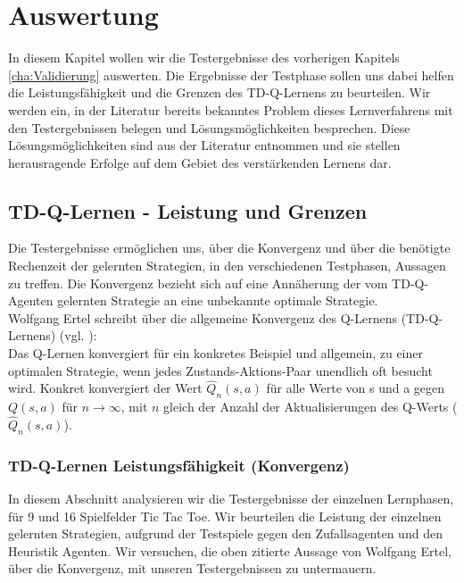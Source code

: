 \chapter{Auswertung}
\label{cha:Auswertung}
In diesem Kapitel wollen wir die Testergebnisse des vorherigen Kapitels \ref{cha:Validierung} auswerten. Die Ergebnisse der Testphase sollen uns dabei helfen die Leistungsfähigkeit und die Grenzen des TD-Q-Lernens zu beurteilen. Wir werden ein, in der Literatur bereits bekanntes Problem dieses Lernverfahrens mit den Testergebnissen belegen und Lösungsmöglichkeiten besprechen. Diese Lösungsmöglichkeiten sind aus der Literatur entnommen und sie stellen herausragende Erfolge auf dem Gebiet des verstärkenden Lernens dar. \\

\section{TD-Q-Lernen - Leistung und Grenzen}
\label{sec:TD-Q-Lernen - Leistung und Grenzen}
Die Testergebnisse ermöglichen uns, über die Konvergenz und über die benötigte Rechenzeit der gelernten Strategien, in den verschiedenen Testphasen, Aussagen zu treffen. Die Konvergenz bezieht sich auf eine Annäherung der vom TD-Q-Agenten gelernten Strategie an eine unbekannte optimale Strategie. \\

Wolfgang Ertel schreibt über die allgemeine Konvergenz des Q-Lernens (TD-Q-Lernens) (vgl. \cite[299]{Ertel}): \\

Das Q-Lernen konvergiert für ein konkretes Beispiel und allgemein, zu einer optimalen Strategie, wenn jedes Zustands-Aktions-Paar unendlich oft besucht wird. Konkret konvergiert der Wert $\hat{Q}_n(s,a)$ für alle Werte von s und a gegen $Q(s,a)$ für $n \rightarrow \infty$, mit $n$ gleich der Anzahl der Aktualisierungen des Q-Werts ($\hat{Q}_n(s,a)$).

\subsection{TD-Q-Lernen Leistungsfähigkeit (Konvergenz)}
In diesem Abschnitt analysieren wir die Testergebnisse der einzelnen Lernphasen, für 9 und 16 Spielfelder Tic Tac Toe. Wir beurteilen die Leistung der einzelnen gelernten Strategien, aufgrund der Testspiele gegen den Zufallsagenten und den Heuristik Agenten. Wir versuchen, die oben zitierte Aussage von Wolfgang Ertel, über die Konvergenz, mit unseren Testergebnissen zu untermauern.  \\

